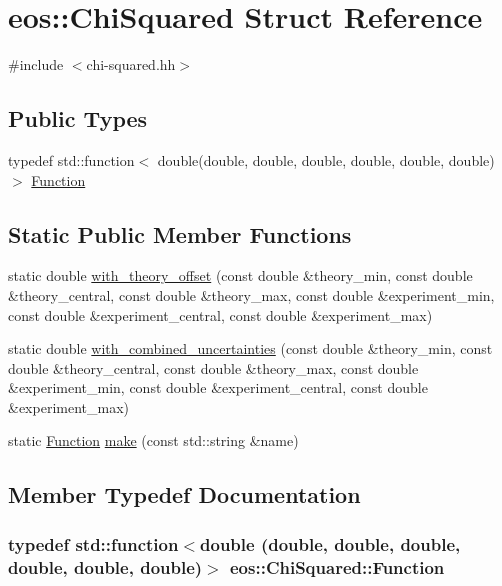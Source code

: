 \hypertarget{structeos_1_1ChiSquared}{
\section{eos::ChiSquared Struct Reference}
\label{structeos_1_1ChiSquared}
}


{\ttfamily \#include $<$chi-\/squared.hh$>$}\subsection*{Public Types}
\begin{DoxyCompactItemize}
\item 
typedef std::function$<$ double(double, double, double, double, double, double)$>$ \hyperlink{structeos_1_1ChiSquared_a27e9ed6fbc17e90137b66be99d417462}{Function}
\end{DoxyCompactItemize}
\subsection*{Static Public Member Functions}
\begin{DoxyCompactItemize}
\item 
static double \hyperlink{structeos_1_1ChiSquared_a842a35bc7a2117ec1caa5f255795e3e7}{with\_\-theory\_\-offset} (const double \&theory\_\-min, const double \&theory\_\-central, const double \&theory\_\-max, const double \&experiment\_\-min, const double \&experiment\_\-central, const double \&experiment\_\-max)
\item 
static double \hyperlink{structeos_1_1ChiSquared_abaedf2005be3dd65831edfae46e97df5}{with\_\-combined\_\-uncertainties} (const double \&theory\_\-min, const double \&theory\_\-central, const double \&theory\_\-max, const double \&experiment\_\-min, const double \&experiment\_\-central, const double \&experiment\_\-max)
\item 
static \hyperlink{structeos_1_1ChiSquared_a27e9ed6fbc17e90137b66be99d417462}{Function} \hyperlink{structeos_1_1ChiSquared_af6ffe7a8101cbc26a837d8359d9784ee}{make} (const std::string \&name)
\end{DoxyCompactItemize}


\subsection{Member Typedef Documentation}
\hypertarget{structeos_1_1ChiSquared_a27e9ed6fbc17e90137b66be99d417462}{
\subsubsection[{Function}]{\setlength{\rightskip}{0pt plus 5cm}typedef std::function$<$double (double, double, double, double, double, double)$>$ {\bf eos::ChiSquared::Function}}}
\label{structeos_1_1ChiSquared_a27e9ed6fbc17e90137b66be99d417462}


